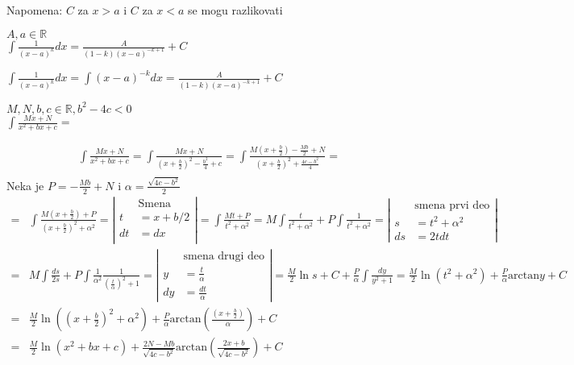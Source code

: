 \documentclass{article}
\begin{document}
Napomena: $C$ za $x > a$ i $C$ za $x < a$ se mogu razlikovati
\begin{primbox}
    $A, a \in \mathbb{R}$\\
    $\int\frac{1}{(x-a)^k}dx = \frac{A}{(1-k)(x-a)^{-k+1}} + C$
\end{primbox}
$\int\frac{1}{(x-a)^k}dx = \int(x-a)^{-k}dx =\frac{A}{(1-k)(x-a)^{-k+1}} + C$
\begin{primbox}
    $M, N, b, c \in \mathbb{R}, b^2 - 4c < 0$\\
    $\int \frac{Mx+N}{x^2+bx + c} = $
\end{primbox}
\begin{align*}
    \int \frac{Mx+N}{x^2+bx + c}
    = \int \frac{Mx + N}{(x + \frac{b}{2})^2-\frac{b^2}{4}+c}
    =\int\frac{M(x+\frac{b}{2})-\frac{Mb}{2} + N}{(x+\frac{b}{2})^2 + \frac{4c-b^2}{4}} = \\
\end{align*}
Neka je $P = -\frac{Mb}{2} + N$ i $\alpha = \frac{\sqrt{4c-b^2}}{2}$
\begin{align*}
    = & \int \frac{M(x + \frac{b}{2}) + P}{(x + \frac{b}{2})^2 + \alpha^2} =
    \left | \begin{alignedat}{3}
                   & \text{Smena} \\
                t  & = x + b/2    \\
                dt & = dx         \\
            \end{alignedat} \right |
    = \int \frac{Mt + P}{t^2 + \alpha ^2}
    = M\int\frac{t}{t^2 + \alpha ^2}+P\int\frac{1}{t^2 + \alpha^2}
    = \left | \begin{alignedat}{3}
                     & \text{smena prvi deo} \\
                  s  & = t^2 + \alpha^2      \\
                  ds & = 2t dt
              \end{alignedat} \right |                                                                                       \\
    = & M\int\frac{ds}{2s} + P\int\frac{1}{\alpha^2}\frac{1}{(\frac{t}{\alpha})^2 + 1}
    = \left | \begin{alignedat}{3}
                     & \text{smena drugi deo} \\
                  y  & = \frac{t}{\alpha}     \\
                  dy & = \frac{dt}{\alpha}
              \end{alignedat}\right |
    = \frac{M}{2}\ln{s} + C + \frac{P}{\alpha}\int\frac{dy}{y^2 + 1}
    = \frac{M}{2}\ln{(t^2 + \alpha^2)} + \frac{P}{\alpha}\text{arctan}y + C                                                    \\
    = & \frac{M}{2}\ln{((x + \frac{b}{2})^2 + \alpha^2)} + \frac{P}{\alpha}\text{arctan}(\frac{(x + \frac{b}{2})}{\alpha}) + C \\
    = & \frac{M}{2}\ln{(x^2 + bx + c)} + \frac{2N-Mb}{\sqrt{4c - b^2}}\text{arctan}(\frac{2x+b}{\sqrt{4c-b^2}}) + C
\end{align*}
\end{document}
